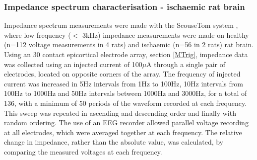 \subsubsection{Impedance spectrum characterisation - ischaemic rat brain}

Impedance spectrum measurements were made with the ScouseTom system \cite{Dowrick_2015}, where low frequency ($<$ 3kHz) impedance measurements were made on healthy (n=112 voltage measurements in 4 rats) and ischaemic (n=56 in 2 rats) rat brain. Using an 30 contact epicortical electrode array, section \ref{MTrig}, impedance data was collected using an injected current of 100$\mu$A through a single pair of electrodes, located on opposite corners of the array. The frequency of injected current was increased in 5Hz intervals from 1Hz to 100Hz, 10Hz intervals from 100Hz to 1000Hz and 50Hz intervals between 1000Hz and 3000Hz, for a total of 136, with a minimum of 50 periods of the waveform recorded at each frequency. This sweep was repeated in ascending and descending order and finally with random ordering. The use of an EEG recorder allowed parallel voltage recording at all electrodes, which were averaged together at each frequency. The relative change in impedance, rather than the absolute value, was calculated, by comparing the measured voltages at each frequency.